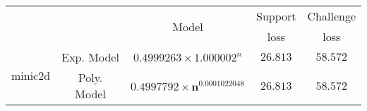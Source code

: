 \begin{tabular}{ccccc} 
\hline 
 &  & \multirow{2}{*}{Model} & Support & Challenge\tabularnewline 
 &  &  & loss  & loss\tabularnewline 
\hline 
\hline 
\multirow{2}{*}{minic2d} & Exp. Model & $0.4999263\times 1.000002^{n}$ & $26.813$ & $58.572$ \tabularnewline 
 & Poly. Model & $\mathbf{0.4997792\times n^{0.0001022048}}$ & $\mathbf{26.813}$ & $\mathbf{58.572}$ \tabularnewline 
\hline 
\end{tabular} 

